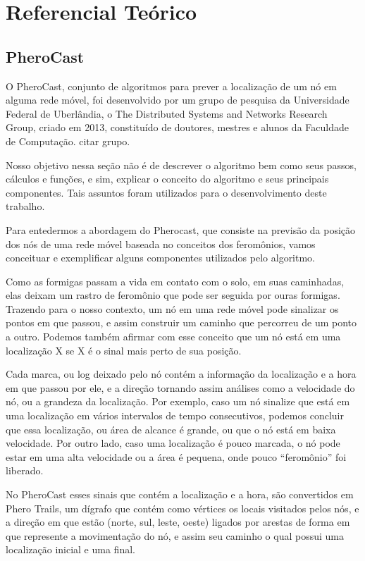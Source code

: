\documentclass[12pt, %
openright, 
oneside,
a4paper,
brazil]{facom-ufu-abntex2}
\begin{document}
\chapter{Referencial Teórico}
\section{PheroCast}

	O PheroCast, conjunto de algoritmos para prever a localização de um nó em alguma rede móvel, foi desenvolvido por um grupo de pesquisa da Universidade Federal de Uberlândia, o The Distributed Systems and Networks  Research Group, criado em 2013, constituído de doutores, mestres e alunos da Faculdade de Computação. citar grupo. 
	
	Nosso objetivo nessa seção não é de descrever o algoritmo bem como seus passos, cálculos e funções, e sim, explicar o conceito do algoritmo e seus principais componentes. Tais assuntos foram utilizados para o desenvolvimento deste trabalho. 
	
	Para entedermos a abordagem do Pherocast, que consiste na previsão da posição dos nós de uma rede móvel baseada no conceitos dos feromônios, vamos conceituar e exemplificar alguns componentes utilizados pelo algoritmo.

	Como as formigas passam a vida em contato com o solo, em suas caminhadas, elas deixam um rastro de feromônio que pode ser seguida por ouras formigas. Trazendo para o nosso contexto, um nó em uma rede móvel pode sinalizar os pontos em que passou, e assim construir um caminho que percorreu de um ponto a outro. Podemos também afirmar com esse conceito que um nó está em uma localização X se X é o sinal mais perto de sua posição.
	
	\cite{6838650} Cada  marca, ou log deixado pelo nó contém a informação da localização e a hora em que passou por ele, e a direção  tornando assim análises como a velocidade do nó, ou a grandeza da localização. Por exemplo, caso um nó sinalize que está em uma localização em vários intervalos de tempo consecutivos, podemos concluir que essa localização, ou área de alcance é grande, ou que o nó está em baixa velocidade. Por outro lado, caso uma localização é  pouco marcada, o nó pode estar em uma alta velocidade ou a área é pequena, onde pouco ``feromônio'' foi liberado.
	
	No PheroCast esses sinais que contém a localização e a hora,  são convertidos em Phero Trails, um dígrafo que contém como vértices os locais visitados pelos nós, e a direção em que estão (norte, sul, leste, oeste) ligados  por arestas de forma em que represente a movimentação do nó, e assim seu caminho o qual possui uma localização inicial e uma final.
	
\end{document}
